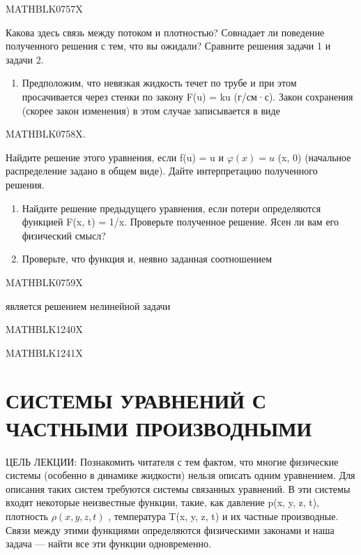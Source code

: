 \documentclass[
]{article}
\providecommand{\tightlist}{%
  \setlength{\itemsep}{0pt}\setlength{\parskip}{0pt}}
\begin{document}
MATHBLK0757X

Какова здесь связь между потоком и плотностью? Совнадает ли поведение
полученного решения с тем, что вы ожидали? Сравните решения задачи 1 и
задачи 2.

\begin{enumerate}
\def\labelenumi{\arabic{enumi}.}
\setcounter{enumi}{2}
\tightlist
\item
  Предположим, что невязкая жидкость течет по трубе и при этом
  просачивается через стенки по закону F(u) = ku (г/см·с). Закон
  сохранения (скорее закон изменения) в этом случае записывается в виде
\end{enumerate}

MATHBLK0758X.

Найдите решение этого уравнения, если f(u) = u и \(\varphi(x) = u\) (x,
0) (начальное распределение задано в общем виде). Дайте интерпретацию
полученного решения.

\begin{enumerate}
\def\labelenumi{\arabic{enumi}.}
\setcounter{enumi}{3}
\item
  Найдите решение предыдущего уравнения, если потери определяются
  функцией F(x, t) = 1/x. Проверьте полученное решение. Ясен ли вам его
  физический смысл?
\item
  Проверьте, что функция и, неявно заданная соотношением
\end{enumerate}

MATHBLK0759X

является решением нелинейной задачи

MATHBLK1240X

MATHBLK1241X

\section{СИСТЕМЫ УРАВНЕНИЙ С ЧАСТНЫМИ
ПРОИЗВОДНЫМИ}\label{ux441ux438ux441ux442ux435ux43cux44b-ux443ux440ux430ux432ux43dux435ux43dux438ux439-ux441-ux447ux430ux441ux442ux43dux44bux43cux438-ux43fux440ux43eux438ux437ux432ux43eux434ux43dux44bux43cux438}

ЦЕЛЬ ЛЕКЦИИ: Познакомить читателя с тем фактом, что многие физические
системы (особенно в динамике жидкости) нельзя описать одним уравнением.
Для описания таких систем требуются системы связанных уравнений. В эти
системы входят некоторые неизвестные функции, такие, как давление p(x,
y, z, t), плотность \(\rho(x, y, z, t)\) , температура T(x, y, z, t) и
их частные производные. Связи между этими функциями определяются
физическими законами и наша задача --- найти все эти функции
одновременно.
\end{document}
